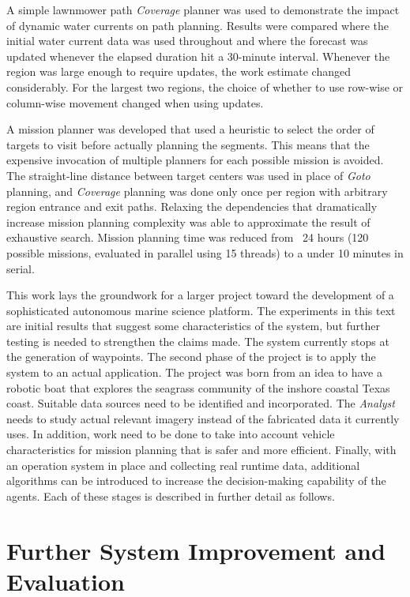 \documentclass{tamuccthesis}
\begin{document}
A simple lawnmower path \textit{Coverage} planner was used to demonstrate the impact of dynamic water currents on path planning. Results were compared where the initial water current data was used throughout and where the forecast was updated whenever the elapsed duration hit a 30-minute interval. Whenever the region was large enough to require updates, the work estimate changed considerably. For the largest two regions, the choice of whether to use row-wise or column-wise movement changed when using updates. 

A mission planner was developed that used a heuristic to select the order of targets to visit before actually planning the segments. This means that the expensive invocation of multiple planners for each possible mission is avoided. The straight-line distance between target centers was used in place of \textit{Goto} planning, and \textit{Coverage} planning was done only once per region with arbitrary region entrance and exit paths. Relaxing the dependencies that dramatically increase mission planning complexity was able to approximate the result of exhaustive search. Mission planning time was reduced from ~24 hours (120 possible missions, evaluated in parallel using 15 threads) to a under 10 minutes in serial. 

This work lays the groundwork for a larger project toward the development of a sophisticated autonomous marine science platform. The experiments in this text are initial results that suggest some characteristics of the system, but further testing is needed to strengthen the claims made. The system currently stops at the generation of waypoints. The second phase of the project is to apply the system to an actual application. The project was born from an idea to have a robotic boat that explores the seagrass community of the inshore coastal Texas coast. Suitable data sources need to be identified and incorporated. The \textit{\textit{Analyst}} needs to study actual relevant imagery instead of the fabricated data it currently uses. In addition, work need to be done to take into account vehicle characteristics for mission planning that is safer and more efficient. Finally, with an operation system in place and collecting real runtime data, additional algorithms can be introduced to increase the decision-making capability of the agents. Each of these stages is described in further detail as follows.

\section{Further System Improvement and Evaluation}
\end{document}
